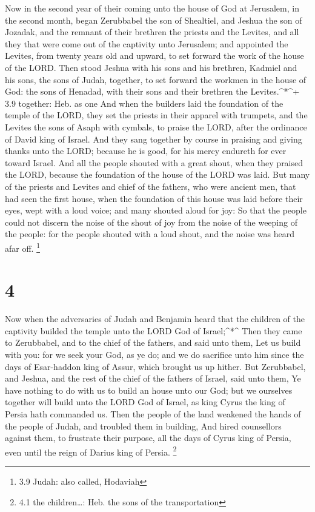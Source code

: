  Now in the second year of their coming unto the house of
God at Jerusalem, in the second month, began Zerubbabel the son of
Shealtiel, and Jeshua the son of Jozadak, and the remnant of their
brethren the priests and the Levites, and all they that were come out of
the captivity unto Jerusalem; and appointed the Levites, from twenty
years old and upward, to set forward the work of the house of the LORD.
 Then stood Jeshua with his sons and his brethren, Kadmiel
and his sons, the sons of Judah, together, to set forward the workmen in
the house of God: the sons of Henadad, with their sons and their
brethren the Levites.\^{}*\^{}+ 3.9 together: Heb. as one 
And when the builders laid the foundation of the temple of the LORD,
they set the priests in their apparel with trumpets, and the Levites the
sons of Asaph with cymbals, to praise the LORD, after the ordinance of
David king of Israel.  And they sang together by course in
praising and giving thanks unto the LORD; because he is good, for his
mercy endureth for ever toward Israel. And all the people shouted with a
great shout, when they praised the LORD, because the foundation of the
house of the LORD was laid.  But many of the priests and
Levites and chief of the fathers, who were ancient men, that had seen
the first house, when the foundation of this house was laid before their
eyes, wept with a loud voice; and many shouted aloud for joy:
 So that the people could not discern the noise of the
shout of joy from the noise of the weeping of the people: for the people
shouted with a loud shout, and the noise was heard afar off. \footnote{3.9
  Judah: also called, Hodaviah}

\hypertarget{section-3}{%
\section{4}\label{section-3}}

 Now when the adversaries of Judah and Benjamin heard that
the children of the captivity builded the temple unto the LORD God of
Israel;\^{}*\^{}  Then they came to Zerubbabel, and to the
chief of the fathers, and said unto them, Let us build with you: for we
seek your God, as ye do; and we do sacrifice unto him since the days of
Esar-haddon king of Assur, which brought us up hither.  But
Zerubbabel, and Jeshua, and the rest of the chief of the fathers of
Israel, said unto them, Ye have nothing to do with us to build an house
unto our God; but we ourselves together will build unto the LORD God of
Israel, as king Cyrus the king of Persia hath commanded us. 
Then the people of the land weakened the hands of the people of Judah,
and troubled them in building,  And hired counsellors
against them, to frustrate their purpose, all the days of Cyrus king of
Persia, even until the reign of Darius king of Persia. \footnote{4.1 the
  children\ldots: Heb. the sons of the transportation}

